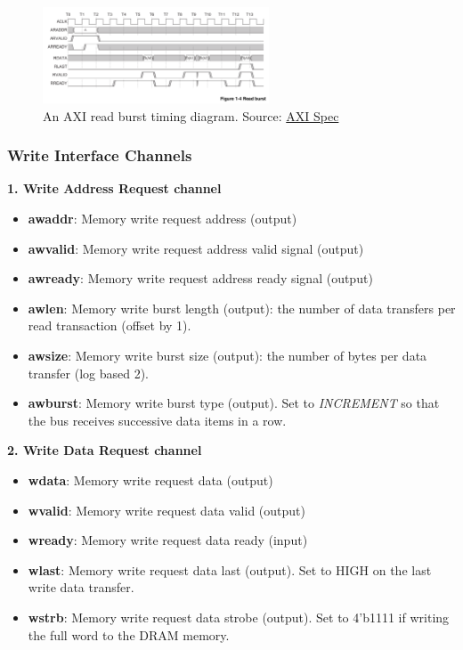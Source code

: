 \documentclass[11pt]{article}
\begin{document}
\begin{figure}[hbt]
\begin{center}
  \includegraphics[width=0.6\textwidth]{axi_read_burst.png}
  \caption{An AXI read burst timing diagram. Source: \href{https://developer.arm.com/documentation/ihi0022/b}{AXI Spec}}
  \label{fig:axi_read_burst}
\end{center}
\end{figure}

\subsubsection{Write Interface Channels}

\textbf{1. Write Address Request channel}
\begin{itemize}
\item \textbf{awaddr}: Memory write request address (output)
\item \textbf{awvalid}: Memory write request address valid signal (output)
\item \textbf{awready}: Memory write request address ready signal (output)
\item \textbf{awlen}: Memory write burst length (output): the number of data transfers per read transaction (offset by 1).
\item \textbf{awsize}: Memory write burst size (output): the number of bytes per data transfer (log based 2).
\item \textbf{awburst}: Memory write burst type (output). Set to \textit{INCREMENT} so that the bus receives successive data items in a row.
\end{itemize}

\textbf{2. Write Data Request channel}
\begin{itemize}
\item \textbf{wdata}: Memory write request data (output)
\item \textbf{wvalid}: Memory write request data valid (output)
\item \textbf{wready}: Memory write request data ready (input)
\item \textbf{wlast}: Memory write request data last (output). Set to HIGH on the last write data transfer.
\item \textbf{wstrb}: Memory write request data strobe (output). Set to 4'b1111 if writing the full word to the DRAM memory.
\end{itemize}
\end{document}
